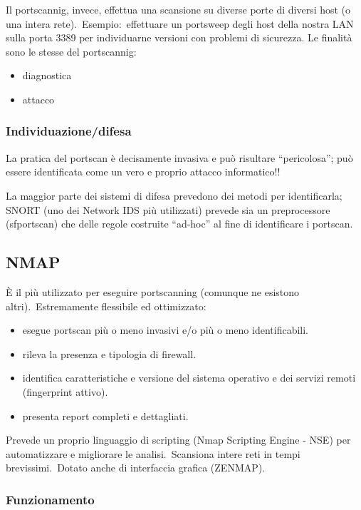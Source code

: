 Il portscannig, invece, effettua una scansione su diverse porte di diversi host (o una intera rete).\
Esempio:\ effettuare un portsweep degli host della nostra LAN sulla porta 3389 per individuarne versioni con problemi di sicurezza.
Le finalità sono le stesse del portscannig:
\begin{itemize}
    \item diagnostica
    \item attacco
\end{itemize}

\subsubsection{Individuazione/difesa}

La pratica del portscan è decisamente invasiva e può risultare ``pericolosa''; può essere identificata come un vero e proprio attacco informatico!!

La maggior parte dei sistemi di difesa prevedono dei metodi per identificarla; SNORT (uno dei Network IDS più utilizzati) prevede sia un preprocessore (sfportscan) che delle regole costruite ``ad-hoc'' al fine di identificare i portscan.

\subsection{NMAP}

È il più utilizzato per eseguire portscanning (comunque ne esistono altri).\
Estremamente flessibile ed ottimizzato:
\begin{itemize}
    \item esegue portscan più o meno invasivi e/o più o meno identificabili.
    \item rileva la presenza e tipologia di firewall.
    \item identifica caratteristiche e versione del sistema operativo e dei servizi remoti (fingerprint attivo).
    \item presenta report completi e dettagliati.
\end{itemize}
Prevede un proprio linguaggio di scripting (Nmap Scripting Engine - NSE) per automatizzare e migliorare le analisi.\
Scansiona intere reti in tempi brevissimi.\
Dotato anche di interfaccia grafica (ZENMAP).

\subsubsection{Funzionamento}

